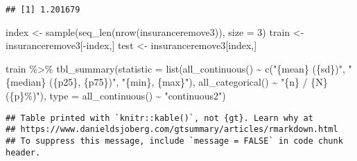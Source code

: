 \documentclass[
]{article}
\newenvironment{Shaded}{\begin{snugshade}}{\end{snugshade}}
\newcommand{\AttributeTok}[1]{\textcolor[rgb]{0.77,0.63,0.00}{#1}}
\newcommand{\DecValTok}[1]{\textcolor[rgb]{0.00,0.00,0.81}{#1}}
\newcommand{\FunctionTok}[1]{\textcolor[rgb]{0.00,0.00,0.00}{#1}}
\newcommand{\NormalTok}[1]{#1}
\newcommand{\OtherTok}[1]{\textcolor[rgb]{0.56,0.35,0.01}{#1}}
\newcommand{\SpecialCharTok}[1]{\textcolor[rgb]{0.00,0.00,0.00}{#1}}
\newcommand{\StringTok}[1]{\textcolor[rgb]{0.31,0.60,0.02}{#1}}
\begin{document}
\begin{verbatim}
## [1] 1.201679
\end{verbatim}

\begin{Shaded}
\begin{Highlighting}[]
\NormalTok{index }\OtherTok{\textless{}{-}} \FunctionTok{sample}\NormalTok{(}\FunctionTok{seq\_len}\NormalTok{(}\FunctionTok{nrow}\NormalTok{(insuranceremove3)), }\AttributeTok{size =} \DecValTok{3}\NormalTok{)}
\NormalTok{train }\OtherTok{\textless{}{-}}\NormalTok{ insuranceremove3[}\SpecialCharTok{{-}}\NormalTok{index,]}
\NormalTok{test }\OtherTok{\textless{}{-}}\NormalTok{ insuranceremove3[index,]}



\NormalTok{train }\SpecialCharTok{\%\textgreater{}\%} 
  \FunctionTok{tbl\_summary}\NormalTok{(}\AttributeTok{statistic =} \FunctionTok{list}\NormalTok{(}\FunctionTok{all\_continuous}\NormalTok{() }\SpecialCharTok{\textasciitilde{}} \FunctionTok{c}\NormalTok{(}\StringTok{"\{mean\} (\{sd\})"}\NormalTok{,}
                                                    \StringTok{"\{median\} (\{p25\}, \{p75\})"}\NormalTok{,}
                                                    \StringTok{"\{min\}, \{max\}"}\NormalTok{),}
                              \FunctionTok{all\_categorical}\NormalTok{() }\SpecialCharTok{\textasciitilde{}} \StringTok{"\{n\} / \{N\} (\{p\}\%)"}\NormalTok{),}
              \AttributeTok{type =} \FunctionTok{all\_continuous}\NormalTok{() }\SpecialCharTok{\textasciitilde{}} \StringTok{"continuous2"}\NormalTok{)}
\end{Highlighting}
\end{Shaded}

\begin{verbatim}
## Table printed with `knitr::kable()`, not {gt}. Learn why at
## https://www.danieldsjoberg.com/gtsummary/articles/rmarkdown.html
## To suppress this message, include `message = FALSE` in code chunk header.
\end{verbatim}
\end{document}
